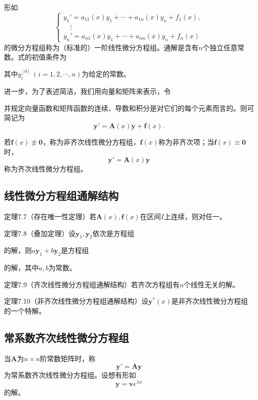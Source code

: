 形如
\[
\begin{cases}
y_1'=a_{11}(x)y_1+\cdots+a_{1n}(x)y_n+f_1(x),\\
\quad\vdots\\
y_n'=a_{n1}(x)y_1+\cdots+a_{nn}(x)y_n+f_n(x)
\end{cases}
\]
的微分方程组称为（标准的）一阶线性微分方程组。通解是含有$n$个独立任意常数。式的初值条件为

其中$y_i^{[0]}\ (i=1,2,\cdots,n)$为给定的常数。

进一步，为了表述简洁，我们用向量和矩阵来表示，令

并规定向量函数和矩阵函数的连续、导数和积分是对它们的每个元素而言的。则可简记为
\[
\boldsymbol{y}'=\boldsymbol{A}(x)\boldsymbol{y}+\boldsymbol{f}(x).
\]

若$\boldsymbol{f}(x)\not\equiv \boldsymbol{0}$，称为非齐次线性微分方程组，$\boldsymbol{f}(x)$称为非齐次项；当$\boldsymbol{f}(x)\equiv \boldsymbol{0}$时，
\[
\boldsymbol{y}'=\boldsymbol{A}(x)\boldsymbol{y}
\]
称为齐次线性微分方程组。

\subsection{线性微分方程组通解结构}

定理7.7（存在唯一性定理）\quad 若$\boldsymbol{A}(x),\boldsymbol{f}(x)$在区间$I$上连续，则对任一。

定理7.8（叠加定理）\quad 设$\boldsymbol{y}_1,\boldsymbol{y}_2$依次是方程组

的解，则$a\boldsymbol{y}_1+b\boldsymbol{y}_2$是方程组

的解，其中$a,b$为常数。

定理7.9（齐次线性微分方程组通解结构）\quad 若齐次方程组有$n$个线性无关的解。

定理7.10（非齐次线性微分方程组通解结构）\quad 设$\boldsymbol{y}^*(x)$是非齐次线性微分方程组的一个特解。

\subsection{常系数齐次线性微分方程组}

当$\boldsymbol{A}$为$n\times n$阶常数矩阵时，称
\[
\boldsymbol{y}'=\boldsymbol{A}\boldsymbol{y}
\]
为常系数齐次线性微分方程组。设想有形如
\[
\boldsymbol{y}=\boldsymbol{v}e^{\lambda x}
\]
的解。